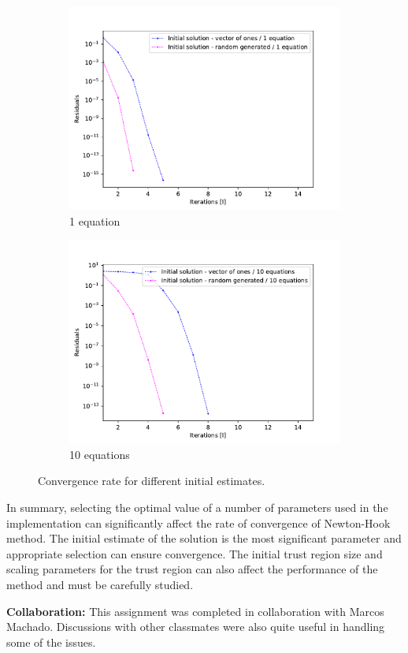 \documentclass[11pt, oneside]{article}
\begin{document}
\begin{figure}[h!]
  \centering
  \begin{subfigure}{.5\textwidth}
    \centering
    \includegraphics[width=1\linewidth]{figures/initial_x1.pdf}
    \caption{1 equation}
    \label{fig:initest_1}
  \end{subfigure}%
  \begin{subfigure}{.5\textwidth}
    \centering
    \includegraphics[width=1\linewidth]{figures/initial_x2.pdf}
    \caption{10 equations}
    \label{fig:initest_2}
  \end{subfigure}
  \caption{Convergence rate for different initial estimates.}
  \label{fig:initest}
\end{figure}

In summary, selecting the optimal value of a number of parameters used in the implementation can significantly affect the rate of convergence of Newton-Hook method. The initial estimate of the solution is the most significant parameter and appropriate selection can ensure convergence. The initial trust region size and scaling parameters for the trust region can also affect the performance of the method and must be carefully studied.

\textbf{Collaboration:} This assignment was completed in collaboration with Marcos Machado. Discussions with other classmates were also quite useful in handling some of the issues.

  
  
\end{document}
